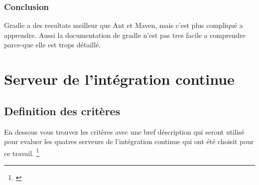 \subsubsection{Conclusion}
Gradle a des resultats meilleur que Ant et Maven, mais c'est plus compliqué a apprendre. Aussi la documentation de gradle n'est pas tres facile a comprendre parce-que elle est trops détaillé.
\newpage
\section{Serveur de l'intégration continue}

\subsection{Definition des critères}

En dessous vous trouvez les critères avec une bref déscription qui seront utilisé pour evaluer les quatres serveurs de l'intégration continue qui ont été choisit pour ce travail. \footnote{\cite{ibmciserver}}

